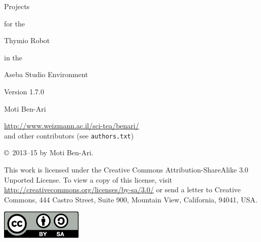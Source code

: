 \thispagestyle{empty}

\begin{center}
\begin{bfseries}
\begin{LARGE}
Projects 

for the 

Thymio Robot

in the 

Aseba Studio Environment

\bigskip
\end{LARGE}

\begin{large}
Version 1.7.0
\end{large}

\begin{LARGE}
\bigskip\bigskip\bigskip\bigskip
Moti Ben-Ari
\end{LARGE}

\bigskip

\begin{large}
\href{http://www.weizmann.ac.il/sci-tea/benari/}{http://www.weizmann.ac.il/sci-tea/benari/}\\
\bigskip
and other contributors (see \texttt{authors.txt})
\end{large}
\end{bfseries}
\end{center}

\vfill

\begin{center}
\copyright{}\  2013--15 by Moti Ben-Ari. 
\end{center}

This work is licensed under the Creative Commons
Attribution-ShareAlike 3.0 Unported License. To view a copy
of this license, visit
\href{http://creativecommons.org/licenses/by-sa/3.0/}{http://creativecommons.org/licenses/by-sa/3.0/}
or send a letter to Creative Commons, 444 Castro Street, Suite 900,
Mountain View, California, 94041, USA.

\begin{center}
\includegraphics[width=.2\textwidth]{../images/by-sa}
\end{center}

\tableofcontents
\thispagestyle{empty}
